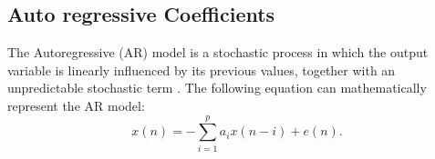 \subsection{Auto regressive Coefficients}
The Autoregressive (AR) model is a stochastic process in which the output variable is linearly influenced by its previous values, together with an unpredictable stochastic term \cite{survey_brain_biometrics}. The following equation can mathematically represent the AR model: 
\begin{equation}
x(n)=-\sum_{i=1}^p a_i x(n-i)+e(n) .
\end{equation} 
